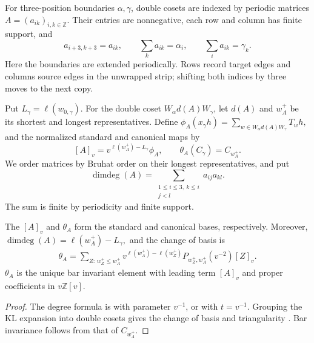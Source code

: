 \documentclass[a4paper,11pt]{amsart}
\numberwithin{equation}{subsection}
\theoremstyle{plain}
\theoremstyle{definition}
\theoremstyle{remark}
\begin{document}
\begin{definition}\label{def:schur-bases}
For three-position boundaries $\alpha,\gamma$, double cosets
are indexed by periodic matrices $A=(a_{ik})_{i,k\in\mathbb Z}$.
Their entries are nonnegative, each row and column has finite
support, and
\[
a_{i+3,k+3}=a_{ik},\qquad
\sum_k a_{ik}=\alpha_i,\qquad
\sum_i a_{ik}=\gamma_k.
\]
Here the boundaries are extended periodically. Rows record
target edges and columns source edges in the unwrapped strip;
shifting both indices by three moves to the next copy.

Put $L_\gamma=\ell(w_{0,\gamma})$. For the double coset
$W_\alpha d(A)W_\gamma$, let $d(A)$ and $w_A^+$ be its shortest
and longest representatives. Define
$\phi_A(x_\gamma h)=\sum_{w\in W_\alpha d(A)W_\gamma}T_wh,$
and the normalized standard and canonical maps by
\[
[A]_v=v^{\ell(w_A^+)-L_\gamma}\phi_A,\qquad
\theta_A(C_\gamma)=C_{w_A^+}.
\]
We order matrices by Bruhat order on their longest
representatives, and put
\[
\operatorname{dimdeg}(A)=
\sum_{\substack{1\le i\le3,\ k\le i\\j<l}}a_{ij}a_{kl}.
\]
The sum is finite by periodicity and finite support.
\end{definition}

\begin{lemma}\label{lem:affine-schur-dictionary}
The $[A]_v$ and $\theta_A$ form the standard and canonical
bases, respectively. Moreover,
$\operatorname{dimdeg}(A)=\ell(w_A^+)-L_\gamma,$
and the change of basis is
\begin{gather}\label{eq:exact-schur-dictionary}
\theta_A=\sum_{Z:\,w_Z^+\le w_A^+}
v^{\ell(w_A^+)-\ell(w_Z^+)}
P_{w_Z^+,w_A^+}(v^{-2})[Z]_v.
\end{gather}
$\theta_A$ is the unique bar invariant element
with leading term $[A]_v$ and proper coefficients in
$v\mathbb Z[v]$.
\end{lemma}

\begin{proof}
The degree formula is \cite[(2.0.3)]{DuFu} with parameter
$v^{-1}$, or \cite[Lemma~7.2]{Cui} with $t=v^{-1}$.
Grouping the KL expansion into double cosets gives the
change of basis and triangularity
\cite[Lemma~3.1, Theorem~3.1, (3.4)--(3.5)]{Cui}.
Bar invariance follows from that of $C_{w_A^+}$.
\end{proof}
\end{document}
